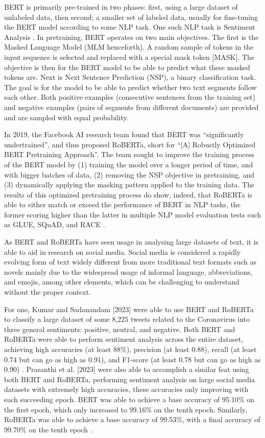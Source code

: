 BERT is primarily pre-trained in two phases: first, using a large dataset of unlabeled data, then second; a smaller set of labeled data, usually for fine-tuning the BERT model according to some NLP task. One such NLP task is Sentiment Analysis \cite{Koroteev-2021}. In pretraining, BERT operates on two main objectives. The first is the Masked Language Model (MLM henceforth). A random sample of tokens in the input sequence is selected and replaced with a special mask token [MASK]. The objective is then for the BERT model to be able to predict what these masked tokens are. Next is Next Sentence Prediction (NSP), a binary classification task. The goal is for the model to be able to predict whether two text segments follow each other. Both positive examples (consecutive sentences from the training set) and negative examples (pairs of segments from different documents) are provided and are sampled with equal probability.

In 2019, the Facebook AI research team found that BERT was “significantly undertrained”, and thus proposed RoBERTa, short for “[A] Robustly Optimized BERT Pretraining Approach”. The team sought to improve the training process of the BERT model by (1) training the model over a longer period of time, and with bigger batches of data, (2) removing the NSP objective in pretraining, and (3) dynamically applying the masking pattern applied to the training data. The results of this optimized pretraining process do show, indeed, that RoBERTa is able to either match or exceed the performance of BERT in NLP tasks, the former scoring higher than the latter in multiple NLP model evaluation tests such as GLUE, SQuAD, and RACE \cite{Liu-2019}.

As BERT and RoBERTa have seen usage in analysing large datasets of text, it is able to aid in research on social media. Social media is considered a rapidly evolving form of text widely different from more traditional text formats such as novels mainly due to the widespread usage of informal language, abbreviations, and emojis, among other elements, which can be challenging to understand without the proper context.

For one, Kumar and Sadanandam [2023] were able to use BERT and RoBERTa to classify a large dataset of some 8,225 tweets related to the Coronavirus into three general sentiments: positive, neutral, and negative. Both BERT and RoBERTa were able to perform sentiment analysis across the entire dataset, achieving high accuracies (at least 88\%), precision (at least 0.88), recall (at least 0.74 but can go as high as 0.91), and F1-score (at least 0.78 but can go as high as 0.90) \cite{Kumar-2023}. Prasanthi et al. [2023] were also able to accomplish a similar feat using both BERT and RoBERTa, performing sentiment analysis on large social media datasets with extremely high accuracies, these accuracies only improving with each succeeding epoch. BERT was able to achieve a base accuracy of 95.10\% on the first epoch, which only increased to 99.16\% on the tenth epoch. Similarly, RoBERTa was able to achieve a base accuracy of 99.53\%, with a final accuracy of 99.70\% on the tenth epoch \cite{Prasanthi-2023}.


